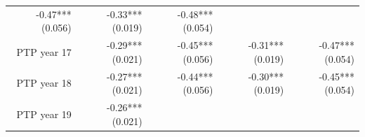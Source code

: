 \documentclass[]{article}
\begin{document}
\begin{longtable}[c]{@{}rrrrr@{}}
\begin{minipage}[t]{0.16\columnwidth}
-0.47*** (0.056)
\strut\end{minipage} &
\begin{minipage}[t]{0.21\columnwidth}\raggedleft\strut
-0.33*** (0.019)
\strut\end{minipage} &
\begin{minipage}[t]{0.15\columnwidth}\raggedleft\strut
-0.48*** (0.054)
\strut\end{minipage}\tabularnewline
\begin{minipage}[t]{0.17\columnwidth}\raggedleft\strut
PTP year 17
\strut\end{minipage} &
\begin{minipage}[t]{0.18\columnwidth}\raggedleft\strut
-0.29*** (0.021)
\strut\end{minipage} &
\begin{minipage}[t]{0.16\columnwidth}\raggedleft\strut
-0.45*** (0.056)
\strut\end{minipage} &
\begin{minipage}[t]{0.21\columnwidth}\raggedleft\strut
-0.31*** (0.019)
\strut\end{minipage} &
\begin{minipage}[t]{0.15\columnwidth}\raggedleft\strut
-0.47*** (0.054)
\strut\end{minipage}\tabularnewline
\begin{minipage}[t]{0.17\columnwidth}\raggedleft\strut
PTP year 18
\strut\end{minipage} &
\begin{minipage}[t]{0.18\columnwidth}\raggedleft\strut
-0.27*** (0.021)
\strut\end{minipage} &
\begin{minipage}[t]{0.16\columnwidth}\raggedleft\strut
-0.44*** (0.056)
\strut\end{minipage} &
\begin{minipage}[t]{0.21\columnwidth}\raggedleft\strut
-0.30*** (0.019)
\strut\end{minipage} &
\begin{minipage}[t]{0.15\columnwidth}\raggedleft\strut
-0.45*** (0.054)
\strut\end{minipage}\tabularnewline
\begin{minipage}[t]{0.17\columnwidth}\raggedleft\strut
PTP year 19
\strut\end{minipage} &
\begin{minipage}[t]{0.18\columnwidth}\raggedleft\strut
-0.26*** (0.021)
\strut\end{minipage} &
\begin{minipage}[t]{0.16\columnwidth}\raggedleft\strut

\end{minipage}
\end{longtable}
\end{document}
